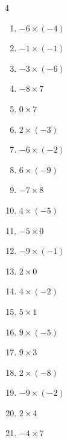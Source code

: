 \begin{multicols}{4}
\begin{enumerate}
  \item $-6\times (-4)$
        \phantom{$=24$}

  \item $-1\times (-1)$
        \phantom{$=1$}

  \item $-3\times (-6)$
        \phantom{$=18$}

  \item $-8\times 7$
        \phantom{$=-56$}

  \item $0\times 7$
        \phantom{$=0$}

  \item $2\times (-3)$
        \phantom{$=-6$}

  \item $-6\times (-2)$
        \phantom{$=12$}

  \item $6\times (-9)$
        \phantom{$=-54$}

  \item $-7\times 8$
        \phantom{$=-56$}

  \item $4\times (-5)$
        \phantom{$=-20$}

  \item $-5\times 0$
        \phantom{$=0$}

  \item $-9\times (-1)$
        \phantom{$=9$}

  \item $2\times 0$
        \phantom{$=0$}

  \item $4\times (-2)$
        \phantom{$=-8$}

  \item $5\times 1$
        \phantom{$=5$}

  \item $9\times (-5)$
        \phantom{$=-45$}

  \item $9\times 3$
        \phantom{$=27$}

  \item $2\times (-8)$
        \phantom{$=-16$}

  \item $-9\times (-2)$
        \phantom{$=18$}

  \item $2\times 4$
        \phantom{$=8$}

  \item $-4\times 7$
        \phantom{$=-28$}


\end{enumerate}
\end{multicols}
